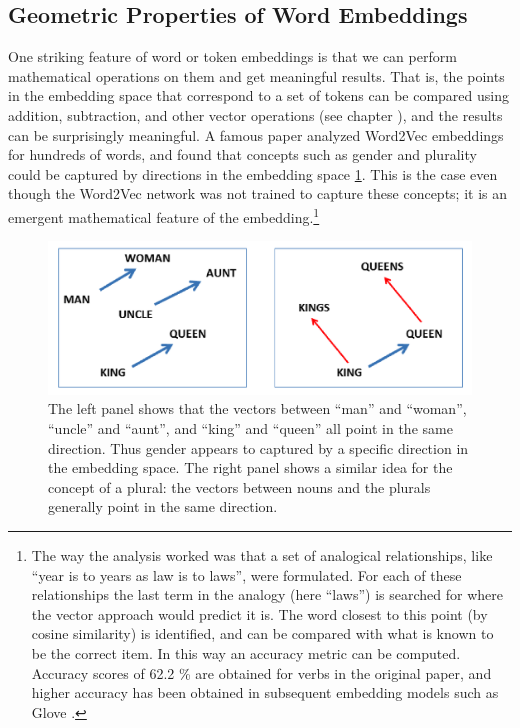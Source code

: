 \subsection{Geometric Properties of Word Embeddings}\label{geometryWordEmbeddings}

One striking feature of word or token embeddings is that we can perform mathematical operations on them and get meaningful results. That is, the points in the embedding space that correspond to a set of tokens can be compared using addition, subtraction, and other vector operations (see chapter ), and the results can be surprisingly meaningful.  A famous paper \cite{mikolov2013linguistic} analyzed Word2Vec embeddings for hundreds of words, and found that concepts such as gender and plurality could be captured by directions in the embedding space \ref{geometryWordEmbedding}. This is the case even though the Word2Vec network was not trained to capture these concepts; it is an emergent mathematical feature of the embedding.\footnote{The way the analysis worked was that a set of analogical relationships, like ``year is to years as law is to laws'', were formulated.  For each of these relationships the last term in the analogy (here ``laws'') is searched for where the vector approach would predict it is. The word closest to this point (by cosine similarity) is identified, and can be compared with what is known to be the correct item. In this way an accuracy metric can be computed.  Accuracy scores of 62.2 \% are obtained for verbs in the original paper, and higher accuracy has been obtained in subsequent embedding models such as Glove \cite{pennington2014glove}.}

\begin{figure}[h]
\centering
\includegraphics[scale=0.4]{./images/kingQueen.png}
\caption[From \cite{mikolov2013linguistic}.]{The left panel shows that the vectors between ``man'' and ``woman'', ``uncle'' and ``aunt'', and ``king'' and ``queen'' all point in the same direction. Thus gender appears to captured by a specific direction in the embedding space. The right panel shows a similar idea for the concept of a plural: the vectors between nouns and the plurals generally point in the same direction.}
\label{geometryWordEmbedding}
\end{figure}

